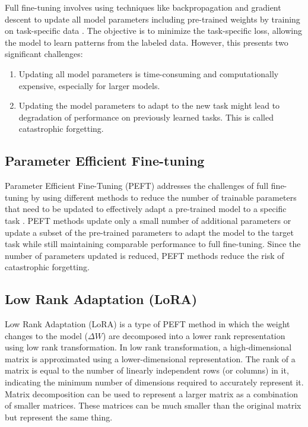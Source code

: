 Full fine-tuning involves using techniques like backpropagation and gradient descent to update all model parameters including pre-trained weights by training on task-specific data \cite{xu2023parameter}. The objective is to minimize the task-specific loss, allowing the model to learn patterns from the labeled data. However, this presents two significant challenges:
\begin{enumerate}
\item Updating all model parameters is time-consuming and computationally expensive, especially for larger models.
\item Updating the model parameters to adapt to the new task might lead to degradation of performance on previously learned tasks. This is called catastrophic forgetting.
\end{enumerate}

\subsection{Parameter Efficient Fine-tuning}
Parameter Efficient Fine-Tuning (PEFT) addresses the challenges of full fine-tuning by using different methods to reduce the number of trainable parameters that need to be updated to effectively adapt a pre-trained model to a specific task \cite{xu2023parameter}. PEFT methods update only a small number of additional parameters or update a subset of the pre-trained parameters to adapt the model to the target task while still maintaining comparable performance to full fine-tuning. Since the number of parameters updated is reduced, PEFT methods reduce the risk of catastrophic forgetting. 

\subsection{Low Rank Adaptation (LoRA)} \label{LoRA}
Low Rank Adaptation (LoRA) \cite{hu2021lora} is a type of PEFT method in which the weight changes to the model (\(\Delta W\)) are decomposed into a lower rank representation using low rank transformation. In low rank transformation, a high-dimensional matrix is approximated using a lower-dimensional representation. The rank of a matrix is equal to the number of linearly independent rows (or columns) in it, indicating the minimum number of dimensions required to accurately represent it. Matrix decomposition can be used to represent a larger matrix as a combination of smaller matrices. These matrices can be much smaller than the original matrix but represent the same thing. 

